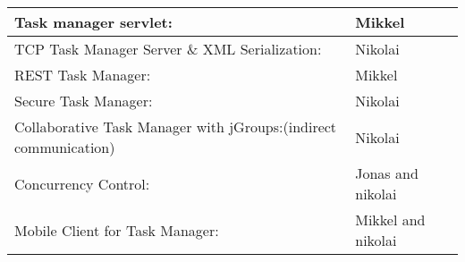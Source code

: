  \label{tab:title}
\begin{tabular}{L{3.0in}L{1.4in} }    %
\toprule[1.5pt] %
Task manager servlet: & Mikkel\\\midrule
TCP Task Manager Server \& XML Serialization: & Nikolai \\\midrule
REST Task Manager: & Mikkel \\\midrule
Secure Task Manager:	 & Nikolai \\\midrule
Collaborative Task Manager with jGroups:\newline (indirect communication) & Nikolai \\\midrule
Concurrency Control: & Jonas and nikolai\\\midrule 
Mobile Client for Task Manager: & Mikkel and nikolai\\
\bottomrule[1.25pt] %
\end {tabular}\par
\bigskip
